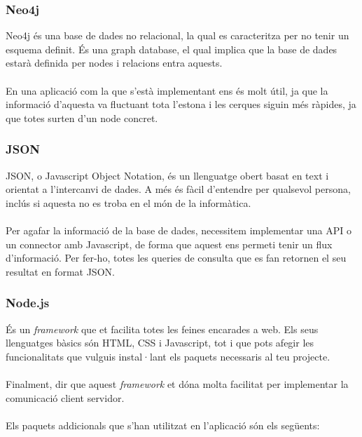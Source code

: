 \documentclass[11pt,catalan,listoffigures,listoftables]{tfgetsinf}
\begin{document}
\subsubsection{Neo4j}

Neo4j és una base de dades no relacional, la qual es caracteritza per no tenir un esquema definit. És una graph database, el qual implica que la base de dades estarà definida per nodes i relacions entra aquests.\\ \\
En una aplicació com la que s'està implementant ens és molt útil, ja que la informació d'aquesta va fluctuant tota l'estona i les cerques siguin més ràpides, ja que totes surten d'un node concret.

\subsubsection{JSON}
JSON, o Javascript Object Notation, és un llenguatge obert basat en text i orientat a l'intercanvi de dades. A més és fàcil d'entendre per qualsevol persona, inclús si aquesta no es troba en el món de la informàtica.\\ \\
Per agafar la informació de la base de dades, necessitem implementar una API o un connector amb Javascript, de forma que aquest ens permeti tenir un flux d'informació. Per fer-ho, totes les queries de consulta que es fan retornen el seu resultat en format JSON.

\subsubsection{Node.js}

És un \textit{framework} que et facilita totes les feines encarades a web. Els seus llenguatges bàsics són HTML, CSS i Javascript, tot i que pots afegir les funcionalitats que vulguis instal·lant els paquets necessaris al teu projecte.\\ \\
Finalment, dir que aquest \textit{framework} et dóna molta facilitat per implementar la comunicació client servidor.\\ \\
Els paquets addicionals que s'han utilitzat en l'aplicació són els següents:
\end{document}
